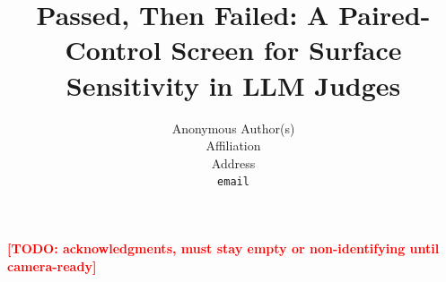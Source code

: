 \documentclass{article}
\title{Passed, Then Failed: A Paired-Control Screen for Surface Sensitivity
in LLM Judges}
\author{%
  Anonymous Author(s) \\
  Affiliation \\
  Address \\
  \texttt{email}
}
\newcommand{\todo}[1]{\textcolor{red}{\textbf{[TODO: #1]}}}
\begin{document}
\maketitle




\begin{ack}
\todo{acknowledgments, must stay empty or non-identifying until camera-ready}
\end{ack}




\appendix
\end{document}
